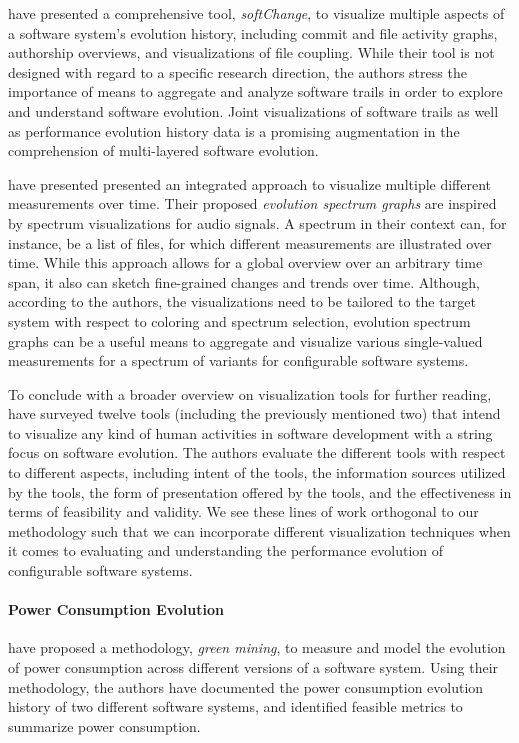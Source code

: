 \cite{german_visualizing_2006} have presented a comprehensive tool,
\emph{softChange}, to visualize multiple aspects of a software system’s
evolution history, including commit and file activity graphs, authorship
overviews, and visualizations of file coupling. While their tool is not
designed with regard to a specific research direction, the authors stress the
importance of means to aggregate and analyze software trails in order to
explore and understand software evolution. Joint visualizations
of software trails as well as performance evolution history data is a promising
augmentation in the comprehension of multi-layered software evolution.

\cite{wu_exploring_2004} have presented presented an integrated approach to
visualize multiple different measurements over time. Their proposed
\emph{evolution spectrum graphs} are inspired by spectrum visualizations for
audio signals. A spectrum in their context can, for instance,  be a list of files, for which
different measurements are illustrated over time. While this approach allows
for a global overview over an arbitrary time span, it also can sketch
fine-grained changes and trends over time. Although, according to the authors, the
visualizations need to be tailored to the target system with respect to
coloring and spectrum selection, evolution spectrum graphs can be a useful
means to aggregate and visualize various single-valued measurements for a
spectrum of variants for configurable software systems.

To conclude with a broader overview on visualization tools for further reading,
\cite{storey_use_2005} have surveyed twelve tools (including the previously
mentioned two) that intend to visualize any kind of human activities in
software development with a string focus on software evolution. The authors
evaluate the different tools with respect to different aspects, including
intent of the tools, the information sources utilized by the tools, the form of
presentation offered by the tools, and the effectiveness in terms of
feasibility and validity.
We see these lines of work orthogonal to our methodology such that we can
incorporate different visualization techniques when it comes to evaluating and
understanding the performance evolution of configurable software systems.

\paragraph{Power Consumption Evolution}
\cite{hindle_green_2015} have proposed a methodology, \emph{green mining}, to
measure and model the evolution of power consumption across different versions of a
software system. Using their methodology, the authors have documented the power
consumption evolution history of two different software systems, and identified
feasible metrics to summarize power consumption. 

